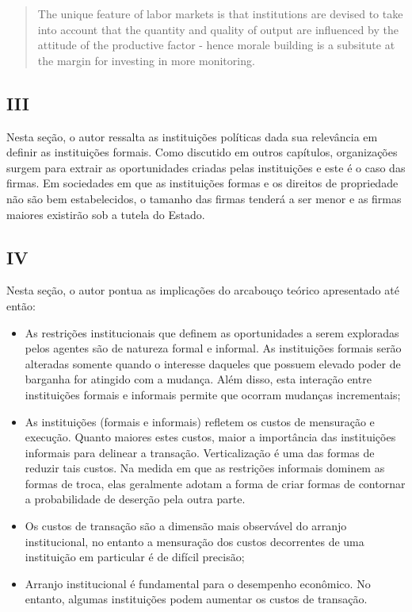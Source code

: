 \begin{quote}
	The unique feature of labor markets is that institutions are
	devised to take into account that the quantity and quality of output are
	influenced by the attitude of the productive factor - hence morale build­ing is a subsitute at the margin for investing in more monitoring.
\end{quote}

\subsection*{III}

Nesta seção, o autor ressalta as instituições políticas dada sua relevância em definir as instituições formais. Como discutido em outros capítulos, organizações surgem para extrair as oportunidades criadas pelas instituições e este é o caso das firmas. Em sociedades em que as instituições formas e os direitos de propriedade não são bem estabelecidos, o tamanho das firmas tenderá a ser menor e as firmas maiores existirão sob a tutela do Estado.

\subsection*{IV}

Nesta seção, o autor pontua as implicações do arcabouço teórico apresentado até então:

\begin{itemize}
	\item As restrições institucionais que definem as oportunidades a serem exploradas pelos agentes são de natureza formal e informal. As instituições formais serão alteradas somente quando o interesse daqueles que possuem elevado poder de barganha for atingido com a mudança. Além disso, esta interação entre instituições formais e informais permite que ocorram mudanças incrementais;
	\item As instituições (formais e informais) refletem os custos de mensuração e execução. Quanto maiores estes custos, maior a importância das instituições informais para delinear a transação. Verticalização é uma das formas de reduzir tais custos. Na medida em que as restrições informais dominem as formas de troca, elas geralmente adotam a forma de criar formas de contornar a probabilidade de deserção pela outra parte.
	\item Os custos de transação são a dimensão mais observável do arranjo institucional, no entanto a mensuração dos custos decorrentes de uma instituição em particular é de difícil precisão;
	\item Arranjo institucional é fundamental para o desempenho econômico. No entanto, algumas instituições podem aumentar os custos de transação.
\end{itemize}